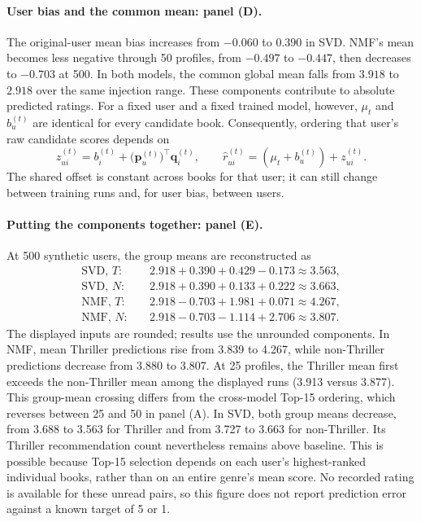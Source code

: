 \paragraph{User bias and the common mean: panel (D).}
The original-user mean bias increases from $-0.060$ to $0.390$ in SVD. NMF's mean becomes less negative through 50 profiles, from $-0.497$ to $-0.447$, then decreases to $-0.703$ at 500. In both models, the common global mean falls from $3.918$ to $2.918$ over the same injection range. These components contribute to absolute predicted ratings. For a fixed user and a fixed trained model, however, $\mu_t$ and $b_u^{(t)}$ are identical for every candidate book. Consequently, ordering that user's raw candidate scores depends on
\begin{equation}
\label{eq:prediction_ranking_score}
z_{ui}^{(t)}=b_i^{(t)}+\bigl(\mathbf p_u^{(t)}\bigr)^\top\mathbf q_i^{(t)},
\qquad
\hat r_{ui}^{(t)}=(\mu_t+b_u^{(t)})+z_{ui}^{(t)}.
\end{equation}
The shared offset is constant across books for that user; it can still change between training runs and, for user bias, between users.

\paragraph{Putting the components together: panel (E).}
At 500 synthetic users, the group means are reconstructed as
\begin{equation}
\label{eq:prediction_numeric_components}
\begin{aligned}
\text{SVD, }T:&\quad 2.918+0.390+0.429-0.173\approx3.563,\\
\text{SVD, }N:&\quad 2.918+0.390+0.133+0.222\approx3.663,\\
\text{NMF, }T:&\quad 2.918-0.703+1.981+0.071\approx4.267,\\
\text{NMF, }N:&\quad 2.918-0.703-1.114+2.706\approx3.807.
\end{aligned}
\end{equation}
The displayed inputs are rounded; results use the unrounded components. In NMF, mean Thriller predictions rise from 3.839 to 4.267, while non-Thriller predictions decrease from 3.880 to 3.807. At 25 profiles, the Thriller mean first exceeds the non-Thriller mean among the displayed runs (3.913 versus 3.877). This group-mean crossing differs from the cross-model Top-15 ordering, which reverses between 25 and 50 in panel (A). In SVD, both group means decrease, from 3.688 to 3.563 for Thriller and from 3.727 to 3.663 for non-Thriller. Its Thriller recommendation count nevertheless remains above baseline. This is possible because Top-15 selection depends on each user's highest-ranked individual books, rather than on an entire genre's mean score. No recorded rating is available for these unread pairs, so this figure does not report prediction error against a known target of 5 or 1.

